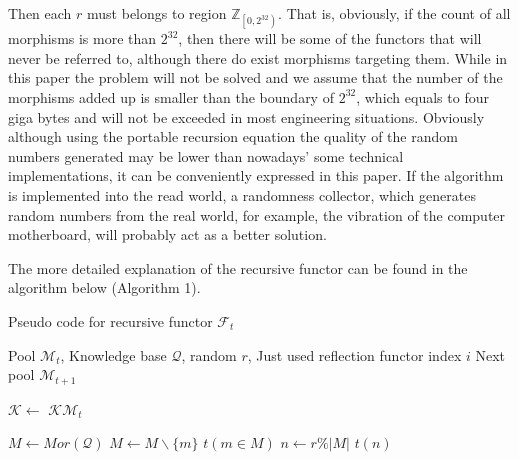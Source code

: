 \documentclass{aims}
\numberwithin{equation}{section}
\numberwithin{theorem}{section}	%
\numberwithin{axiom}{section}	%
\numberwithin{definition}{section}	%
\begin{document}
	Then each \(\mathit{r}\) must belongs to region \(\mathbb{Z}_{\left.\left[0,2^{32}\right.\right)}\). That is, obviously, if the count of all morphisms is more than $2^32$, then there will be some of the functors that will never be referred to, although there do exist morphisms targeting them. While in this paper the problem will not be solved and we assume that the number of the morphisms added up is smaller than the boundary of \(2^{32}\), which equals to four giga bytes and will not be exceeded in most engineering situations. Obviously although using the portable recursion equation the quality of the random numbers generated may be lower than nowadays{'} some technical implementations, it can be conveniently expressed in this paper. If the algorithm is implemented into the read world, a randomness collector, which generates random numbers from the real world, for example, the vibration of the computer motherboard, will probably act as a better solution.
	
	The more detailed explanation of the recursive functor can be found in the algorithm below (Algorithm 1).
	
	\begin{algorithm}[h!]
		\caption{Pseudo code for recursive functor $\mathcal{F}_t$}
		\begin{algorithmic}[1]
			\Require Pool $\mathcal{M}_{t}$, Knowledge base $\mathcal{Q}$, random $\mathit{r}$, Just used reflection functor index $i$
			\Ensure Next pool $\mathcal{M}_{t+1}$
			
			\State $\mathcal{K} \gets $ 
			\State \Return $\mathcal{K} \mathcal{M}_t$
			\EndFunction
			
			\State $M \gets Mor(\mathcal{Q})$
			\State $M \gets M \backslash \{m\}$
			\EndIf
			\EndFor
			\State \Return $t(m \in M)$
			\Else
			\State $n \gets \mathit{r} \% |M|$
			\State \Return $t(n)$
			\EndIf
			\EndFunction
		\end{algorithmic}
	\end{algorithm}
	
\end{document}
